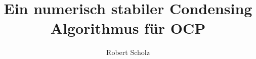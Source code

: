 \documentclass{amsart}
\theoremstyle{definition}
\theoremstyle{remark}
\numberwithin{equation}{section}
\begin{document}

\title{Ein numerisch stabiler Condensing Algorithmus für OCP}


\author{Robert	Scholz}
\address{IWR Uni Heidelberg}







\maketitle






\end{document}
